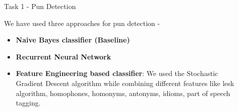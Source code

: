 \documentclass[final]{beamer}
\newlength{\onecolwid}
\newlength{\twocolwid}
\begin{document}
\begin{frame}[t]
\begin{columns}[t]
\begin{column}{\twocolwid}
\begin{columns}[t,totalwidth=\twocolwid]
\begin{column}{\onecolwid}
\begin{block}{Task 1 - Pun Detection}
{							We have used three approaches for pun detection - 
							\begin{itemize}
							\item {\textbf{Naive Bayes classifier (Baseline)}}
							\item {\textbf{Recurrent Neural Network}}
							\item {\textbf{Feature Engineering based classifier}: We used the Stochastic Gradient Descent algorithm while combining different features like lesk algorithm, homophones, homonyms, antonyms, idioms, part of speech tagging.}
							\end{itemize}
						}
					\end{block}
				\end{column}
				\begin{column}{\onecolwid}\vspace{-.6in}
				

\end{column}
\end{columns}
\end{column}
\end{columns}
\end{frame}
\end{document}
